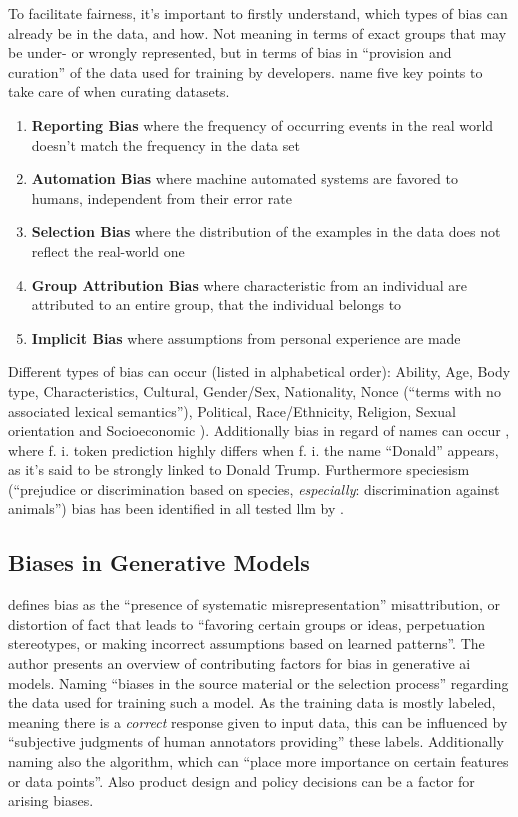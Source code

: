 To facilitate fairness, it's important to firstly understand, which types of bias can already be in the data, and how. Not meaning in terms of exact groups that may be under- or wrongly represented, but in terms of bias in \enquote{provision and curation} of the data used for training by developers. \citet{google-fairness} name five key points to take care of when curating datasets. 
\begin{enumerate}
    \item \textbf{Reporting Bias} where the frequency of occurring events in the real world doesn't match the frequency in the data set
    \item \textbf{Automation Bias} where machine automated systems are favored to humans, independent from their error rate
    \item \textbf{Selection Bias} where the distribution of the examples in the data does not reflect the real-world one 
    \item \textbf{Group Attribution Bias} where characteristic from an individual are attributed to an entire group, that the individual belongs to 
    \item \textbf{Implicit Bias} where assumptions from personal experience are made 
\end{enumerate}


Different types of bias can occur (listed in alphabetical order): Ability, Age, Body type, Characteristics, Cultural, Gender/Sex, Nationality, Nonce (\enquote{terms with no associated lexical semantics}), Political, Race/Ethnicity, Religion, Sexual orientation and Socioeconomic  \citep{holistic}). Additionally bias in regard of names can occur \citep{shwartz-name}, where f. i. token prediction highly differs when f. i. the name \enquote{Donald} appears, as it's said to be strongly linked to Donald Trump. Furthermore speciesism (\enquote{prejudice or discrimination based on species, \textit{especially}: discrimination against animals}\citep{Oxf:speciesism}) bias has been identified in all tested \acrshort{llm} by \citet{animal-ai}. 


\subsection{Biases in Generative Models}

\citet{ferrara} defines bias as the \enquote{presence of systematic misrepresentation} misattribution, or distortion of fact that leads to \enquote{favoring certain groups or ideas, perpetuation stereotypes, or making incorrect assumptions based on learned patterns}. The author presents an overview of contributing factors for bias in generative \acrshort{ai} models. Naming \enquote{biases in the source material or the selection process} regarding the data used for training such a model. As the training data is mostly labeled, meaning there is a \textit{correct} response given to input data, this can be influenced by \enquote{subjective judgments of human annotators providing} these labels. Additionally naming also the algorithm, which can \enquote{place more importance on certain features or data points}. Also product design and policy decisions can be a factor for arising biases.

